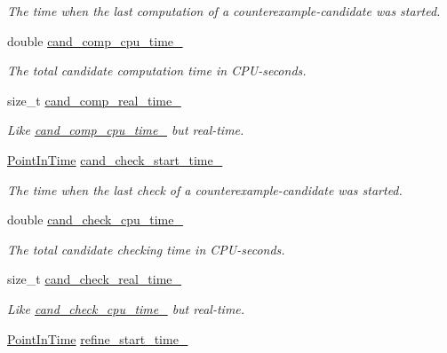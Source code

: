 \begin{DoxyCompactItemize}
\begin{DoxyCompactList}\small\item\em The time when the last computation of a counterexample-\/candidate was started. \end{DoxyCompactList}\item 
double \hyperlink{classLearnStatisticsSAT_af977c00fbf0f9978f92dd5c997577a06}{cand\-\_\-comp\-\_\-cpu\-\_\-time\-\_\-}
\begin{DoxyCompactList}\small\item\em The total candidate computation time in C\-P\-U-\/seconds. \end{DoxyCompactList}\item 
size\-\_\-t \hyperlink{classLearnStatisticsSAT_a278872231b15ff010ae4e3a60e8d8f11}{cand\-\_\-comp\-\_\-real\-\_\-time\-\_\-}
\begin{DoxyCompactList}\small\item\em Like \hyperlink{classLearnStatisticsSAT_af977c00fbf0f9978f92dd5c997577a06}{cand\-\_\-comp\-\_\-cpu\-\_\-time\-\_\-} but real-\/time. \end{DoxyCompactList}\item 
\hyperlink{Stopwatch_8h_af3a9f634f27bed7e98dbc23e5c6f807d}{Point\-In\-Time} \hyperlink{classLearnStatisticsSAT_a1effa4c15e4349fb1e6f62ad6c79d6c5}{cand\-\_\-check\-\_\-start\-\_\-time\-\_\-}
\begin{DoxyCompactList}\small\item\em The time when the last check of a counterexample-\/candidate was started. \end{DoxyCompactList}\item 
double \hyperlink{classLearnStatisticsSAT_a2ab5cd522b7a4d700a11c0bb430baa81}{cand\-\_\-check\-\_\-cpu\-\_\-time\-\_\-}
\begin{DoxyCompactList}\small\item\em The total candidate checking time in C\-P\-U-\/seconds. \end{DoxyCompactList}\item 
size\-\_\-t \hyperlink{classLearnStatisticsSAT_a2e0611b0c6f80cbc7b36f25ce5e89db9}{cand\-\_\-check\-\_\-real\-\_\-time\-\_\-}
\begin{DoxyCompactList}\small\item\em Like \hyperlink{classLearnStatisticsSAT_a2ab5cd522b7a4d700a11c0bb430baa81}{cand\-\_\-check\-\_\-cpu\-\_\-time\-\_\-} but real-\/time. \end{DoxyCompactList}\item 
\hyperlink{Stopwatch_8h_af3a9f634f27bed7e98dbc23e5c6f807d}{Point\-In\-Time} \hyperlink{classLearnStatisticsSAT_af358ee7d57095acbb602d9b9e1329dd2}{refine\-\_\-start\-\_\-time\-\_\-}

\end{DoxyCompactItemize}
